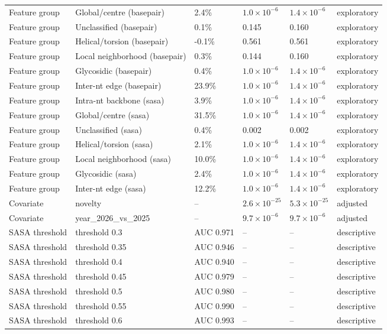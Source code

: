 \documentclass[pdflatex,sn-nature]{sn-jnl}
\begin{document}
\begin{adjustbox}{width=\textwidth}
\begin{tabular}{llllll}
Feature group & Global/centre (basepair) & 2.4\% & $1.0\times10^{-6}$ & $1.4\times10^{-6}$ & exploratory \\
Feature group & Unclassified (basepair) & 0.1\% & 0.145 & 0.160 & exploratory \\
Feature group & Helical/torsion (basepair) & -0.1\% & 0.561 & 0.561 & exploratory \\
Feature group & Local neighborhood (basepair) & 0.3\% & 0.144 & 0.160 & exploratory \\
Feature group & Glycosidic (basepair) & 0.4\% & $1.0\times10^{-6}$ & $1.4\times10^{-6}$ & exploratory \\
Feature group & Inter-nt edge (basepair) & 23.9\% & $1.0\times10^{-6}$ & $1.4\times10^{-6}$ & exploratory \\
Feature group & Intra-nt backbone (sasa) & 3.9\% & $1.0\times10^{-6}$ & $1.4\times10^{-6}$ & exploratory \\
Feature group & Global/centre (sasa) & 31.5\% & $1.0\times10^{-6}$ & $1.4\times10^{-6}$ & exploratory \\
Feature group & Unclassified (sasa) & 0.4\% & 0.002 & 0.002 & exploratory \\
Feature group & Helical/torsion (sasa) & 2.1\% & $1.0\times10^{-6}$ & $1.4\times10^{-6}$ & exploratory \\
Feature group & Local neighborhood (sasa) & 10.0\% & $1.0\times10^{-6}$ & $1.4\times10^{-6}$ & exploratory \\
Feature group & Glycosidic (sasa) & 2.4\% & $1.0\times10^{-6}$ & $1.4\times10^{-6}$ & exploratory \\
Feature group & Inter-nt edge (sasa) & 12.2\% & $1.0\times10^{-6}$ & $1.4\times10^{-6}$ & exploratory \\
Covariate & novelty & -- & $2.6\times10^{-25}$ & $5.3\times10^{-25}$ & adjusted \\
Covariate & year\_2026\_vs\_2025 & -- & $9.7\times10^{-6}$ & $9.7\times10^{-6}$ & adjusted \\
SASA threshold & threshold 0.3 & AUC 0.971 & -- & -- & descriptive \\
SASA threshold & threshold 0.35 & AUC 0.946 & -- & -- & descriptive \\
SASA threshold & threshold 0.4 & AUC 0.940 & -- & -- & descriptive \\
SASA threshold & threshold 0.45 & AUC 0.979 & -- & -- & descriptive \\
SASA threshold & threshold 0.5 & AUC 0.980 & -- & -- & descriptive \\
SASA threshold & threshold 0.55 & AUC 0.990 & -- & -- & descriptive \\
SASA threshold & threshold 0.6 & AUC 0.993 & -- & -- & descriptive \\
\bottomrule
\end{tabular}
\end{adjustbox}
\endgroup
\end{document}
